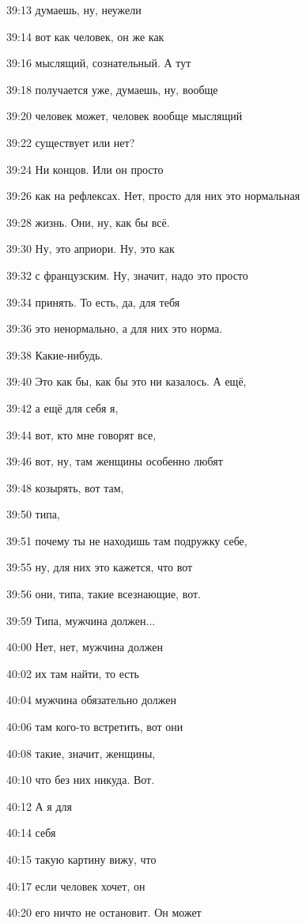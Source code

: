 39:13
думаешь, ну, неужели

39:14
вот как человек, он же как

39:16
мыслящий, сознательный. А тут

39:18
получается уже, думаешь, ну, вообще

39:20
человек может, человек вообще мыслящий

39:22
существует или нет?

39:24
Ни концов. Или он просто

39:26
как на рефлексах. Нет, просто для них это нормальная

39:28
жизнь. Они, ну, как бы всё.

39:30
Ну, это априори. Ну, это как

39:32
с французским. Ну, значит, надо это просто

39:34
принять. То есть, да, для тебя

39:36
это ненормально, а для них это норма.

39:38
Какие-нибудь.

39:40
Это как бы, как бы это ни казалось. А ещё,

39:42
а ещё для себя я,

39:44
вот, кто мне говорят все,

39:46
вот, ну, там женщины особенно любят

39:48
козырять, вот там,

39:50
типа,

39:51
почему ты не находишь там подружку себе,

39:55
ну, для них это кажется, что вот

39:56
они, типа, такие всезнающие, вот.

39:59
Типа, мужчина должен...

40:00
Нет, нет, мужчина должен

40:02
их там найти, то есть

40:04
мужчина обязательно должен

40:06
там кого-то встретить, вот они

40:08
такие, значит, женщины,

40:10
что без них никуда. Вот.

40:12
А я для

40:14
себя

40:15
такую картину вижу, что

40:17
если человек хочет, он

40:20
его ничто не остановит. Он может

